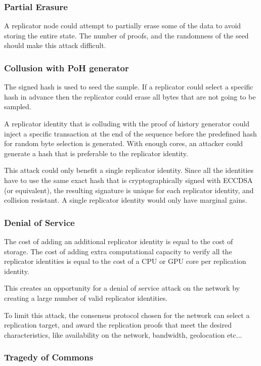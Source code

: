 \documentclass[12pt]{article}
\begin{document}
\subsubsection{Partial Erasure}

A replicator node could attempt to partially erase some of the data to avoid storing the entire state. The number of proofs, and the randomness of the seed should make this attack difficult.

\subsubsection{Collusion with PoH generator}

The signed hash is used to seed the sample. If a replicator could select a specific hash in advance then the replicator could erase all bytes that are not going to be sampled.

A replicator identity that is colluding with the proof of history generator could inject a specific transaction at the end of the sequence before the predefined hash for random byte selection is generated. With enough cores, an attacker could generate a hash that is preferable to the replicator identity.

This attack could only benefit a single replicator identity. Since all the identities have to use the same exact hash that is cryptographically signed with ECCDSA (or equivalent), the resulting signature is unique for each replicator identity, and collision resistant. A single replicator identity would only have marginal gains.
\subsubsection{Denial of Service}
The cost of adding an additional replicator identity is equal to the cost of storage. The cost of adding extra computational capacity to verify all the replicator identities is equal to the cost of a CPU or GPU core per replication identity.

This creates an opportunity for a denial of service attack on the network by creating a large number of valid replicator identities.

To limit this attack, the consensus protocol chosen for the network can select a replication target, and award the replication proofs that meet the desired characteristics, like availability on the network, bandwidth, geolocation etc...
\subsubsection{Tragedy of Commons}
\end{document}
